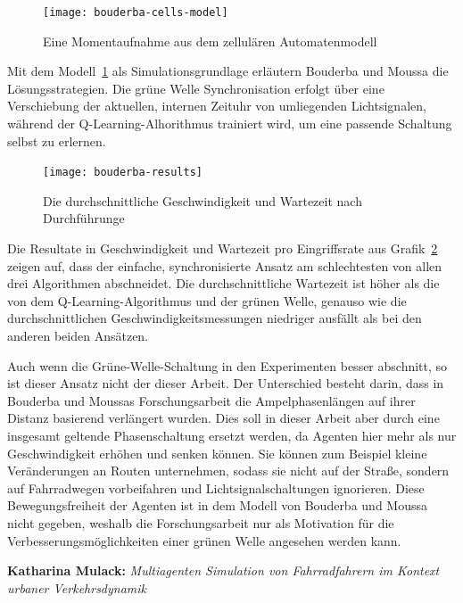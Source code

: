 \begin{figure}[h]
    \centering
    \texttt{[image: bouderba-cells-model]}~\caption{Eine Momentaufnahme aus dem zellulären Automatenmodell~\cite[S. 3]{Bouderba2019}}
    \label{fig:bouderba-cells-model}
\end{figure}

Mit dem Modell~\ref{fig:bouderba-cells-model} als Simulationsgrundlage erläutern Bouderba und Moussa die Lösungsstrategien.
Die grüne Welle Synchronisation erfolgt über eine Verschiebung der aktuellen, internen Zeituhr von umliegenden Lichtsignalen, während der Q-Learning-Alhorithmus trainiert wird, um eine passende Schaltung selbst zu erlernen.

\begin{figure}[h]
    \centering
    \texttt{[image: bouderba-results]}~\caption{Die durchschnittliche Geschwindigkeit und Wartezeit nach Durchführunge~\cite[S. 5]{Bouderba2019}}
    \label{fig:bouderba-result-graph}
\end{figure}


Die Resultate in Geschwindigkeit und Wartezeit pro Eingriffsrate aus Grafik~\ref{fig:bouderba-result-graph} zeigen auf, dass der einfache, synchronisierte Ansatz am schlechtesten von allen drei Algorithmen abschneidet.
Die durchschnittliche Wartezeit ist höher als die von dem Q-Learning-Algorithmus und der grünen Welle, genauso wie die durchschnittlichen Geschwindigkeitsmessungen niedriger ausfällt als bei den anderen beiden Ansätzen.

Auch wenn die Grüne-Welle-Schaltung in den Experimenten besser abschnitt, so ist dieser Ansatz nicht der dieser Arbeit.
Der Unterschied besteht darin, dass in Bouderba und Moussas Forschungsarbeit die Ampelphasenlängen auf ihrer Distanz basierend verlängert wurden.
Dies soll in dieser Arbeit aber durch eine insgesamt geltende Phasenschaltung ersetzt werden, da Agenten hier mehr als nur Geschwindigkeit erhöhen und senken können.
Sie können zum Beispiel kleine Veränderungen an Routen unternehmen, sodass sie nicht auf der Straße, sondern auf Fahrradwegen vorbeifahren und Lichtsignalschaltungen ignorieren.
Diese Bewegungsfreiheit der Agenten ist in dem Modell von Bouderba und Moussa nicht gegeben, weshalb die Forschungsarbeit nur als Motivation für die Verbesserungsmöglichkeiten einer grünen Welle angesehen werden kann.


\textbf{Katharina Mulack:}
\textit{Multiagenten Simulation von Fahrradfahrern im Kontext urbaner Verkehrsdynamik}

